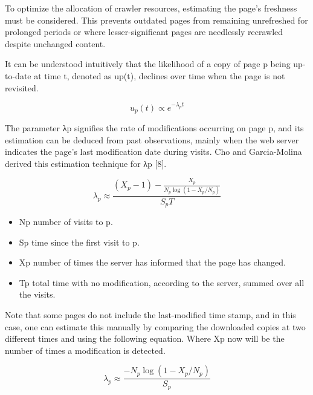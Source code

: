 To optimize the allocation of crawler resources, estimating the page's freshness must be considered. This prevents outdated pages from remaining unrefreshed for prolonged periods or where lesser-significant pages are needlessly recrawled despite unchanged content.


It can be understood intuitively that the likelihood of a copy of page p being up-to-date at time t, denoted as up(t), declines over time when the page is not revisited.

\begin{equation}
u_p(t) \propto e^{-\lambda_pt}
\label{eq:depth}
\end{equation}

The parameter λp signifies the rate of modifications occurring on page p, and its estimation can be deduced from past observations, mainly when the web server indicates the page's last modification date during visits. Cho and Garcia-Molina derived this estimation technique for λp [8].

\begin{equation}
\lambda_p \approx \frac{(X_p-1) - \frac{X_p}{N_p\log(1-X_p/N_p)}}{S_pT}
\label{eq:depth}
\end{equation}

\begin{itemize}
  \item Np number of visits to p.  
  \item Sp time since the first visit to p.
\item Xp number of times the server has informed that the page has changed.
\item Tp total time with no modification, according to the server, summed over all the visits.
\end{itemize}

Note that some pages do not include the last-modified time stamp, and in this case, one can estimate this manually by comparing the
downloaded copies at two different times and using the following equation. Where Xp now will be the number of times a modification is detected.

\begin{equation}
\lambda_p \approx \frac{-N_p\log(1-X_p/N_p)}{S_p}
\label{eq:depth}
\end{equation}
